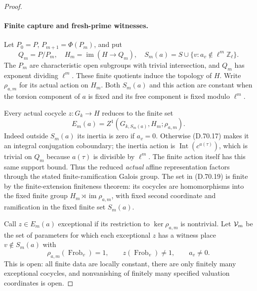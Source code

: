 \begin{proof}
\paragraph{Finite capture and fresh-prime witnesses.}
Let \(P_0=P\), \(P_{m+1}=\Phi(P_m)\), and put
\[
 Q_m=P/P_m,\quad H_m=\operatorname{im}(H\to Q_m),\quad
 S_m(a)=S\cup\{v:a_v\notin\ell^m\mathbb Z_\ell\}.
                                                        \tag{D.70.18}
\]
The \(P_m\) are characteristic open subgroups
with trivial intersection, and \(Q_m\) has
exponent dividing \(\ell^m\). These finite
quotients induce the topology of \(H\).
Write \(\rho_{a,m}\) for its actual action on
\(H_m\). Both \(S_m(a)\) and this action are
constant when the torsion component of \(a\)
is fixed and its free component is fixed
modulo \(\ell^m\).

Every actual cocycle \(z:G_k\to H\) reduces
to the finite set
\[
 E_m(a)=Z^1(G_{k,S_m(a)},H_m;\rho_{a,m}).
                                                        \tag{D.70.19}
\]
Indeed outside \(S_m(a)\) its inertia is zero
if \(a_v=0\). Otherwise (D.70.17) makes it
an integral conjugation coboundary; the
inertia action is
\(\operatorname{Int}(c^{a(\tau)})\), which is
trivial on \(Q_m\) because \(a(\tau)\) is
divisible by \(\ell^m\). The finite action
itself has this same support bound. Thus
the reduced \emph{actual} affine
representation factors through the stated
finite-ramification Galois group.
The set in (D.70.19) is finite by the
finite-extension finiteness theorem: its
cocycles are homomorphisms into the fixed
finite group \(H_m\rtimes\operatorname{im}\rho_{a,m}\),
with fixed second coordinate and ramification
in the fixed finite set \(S_m(a)\).

Call \(z\in E_m(a)\) exceptional if its
restriction to \(\ker\rho_{a,m}\) is nontrivial.
Let \({\cal V}_m\) be the set of parameters
for which each exceptional \(z\) has a
witness place \(v\notin S_m(a)\) with
\[
 \rho_{a,m}(\operatorname{Frob}_v)=1,\qquad
 z(\operatorname{Frob}_v)\ne1,\qquad a_v\ne0.
                                                        \tag{D.70.20}
\]
This is open: all finite data are locally
constant, there are only finitely many
exceptional cocycles, and nonvanishing of
finitely many specified valuation coordinates
is open.


\end{proof}
